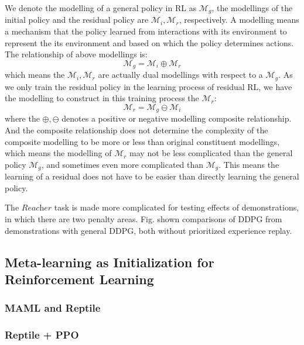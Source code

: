 \documentclass{article}
\begin{document}
We denote the modelling of a general policy in RL as $\mathcal{M}_g$, the modellings of the initial policy and the residual policy are $\mathcal{M}_i, \mathcal{M}_r$, respectively. A modelling means a mechanism that the policy learned from interactions with its environment to represent the its environment and based on which the policy determines actions. The relationship of above modellings is:
\begin{equation}
	\mathcal{M}_g = \mathcal{M}_i \oplus \mathcal{M}_r
 \end{equation}
 which means the $\mathcal{M}_i, \mathcal{M}_r$ are actually dual modellings with respect to a $\mathcal{M}_g$. As we only train the residual policy in the learning process of residual RL, we have the modelling to construct in this training process the $\mathcal{M}_r$:
 \begin{equation}
 \mathcal{M}_r = \mathcal{M}_g \ominus \mathcal{M}_i
 \end{equation}
 where the $\oplus, \ominus$ denotes a positive or negative modelling composite relationship. And the composite relationship does not determine the complexity of the composite modelling to be more or less than original constituent modellings, which means the modelling of $\mathcal{M}_r$ may not be less complicated than the general policy $\mathcal{M}_g$, and sometimes even more complicated than $\mathcal{M}_g$. This means the learning of a residual does not have to be easier than directly learning the general policy.
 
 The $\textit{Reacher}$ task is made more complicated for testing effects of demonstrations, in which there are two penalty areas. Fig. shown comparisons of DDPG from demonstrations with general DDPG, both without prioritized experience replay.

\subsection{Meta-learning as Initialization for Reinforcement Learning}

\subsubsection{MAML and Reptile}

\subsubsection{Reptile + PPO}
\end{document}
